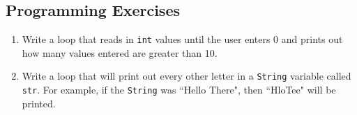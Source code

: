 \subsection{Programming Exercises}

\begin{enumerate}

\item Write a loop that reads in \verb|int| values until the user enters 0 and prints out how many values entered are greater than 10.

\item Write a loop that will print out every other letter in a \verb|String| variable called \verb|str|. For example, if the \verb|String| was ``Hello There", then ``HloTee" will be printed.

\end{enumerate}